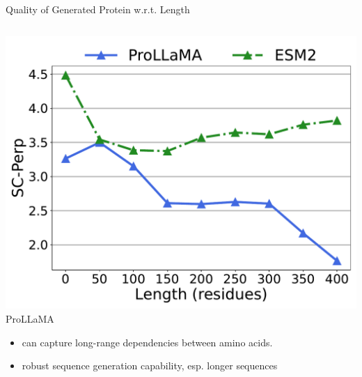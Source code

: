 \begin{frame}{Quality of Generated Protein w.r.t. Length}
\begin{columns}
\begin{column}{0.5\textwidth}
		\includegraphics[scale=0.23]{images/combined_length_scperp_zhexiantu.pdf}
		ProLLaMA
		\begin{itemize}
			\item can capture long-range dependencies between amino acids.
			\item robust sequence generation capability, esp. longer sequences
		\end{itemize}
	\end{column}
\end{columns}
\vspace{-0.25em}
\end{frame}